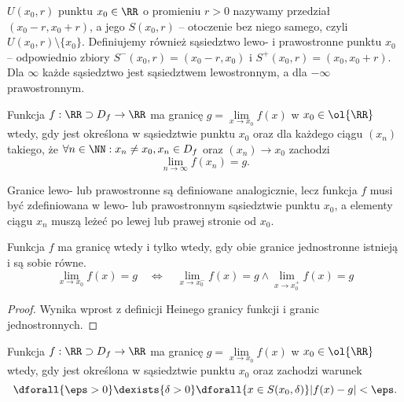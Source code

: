  $U(x_0, r)$ punktu $x_0 \in \RR$ o promieniu $r > 0$ nazywamy przedział $(x_0 - r, x_0 + r)$, a jego  $S(x_0, r)$ -- otoczenie bez niego samego, czyli $U(x_0, r) \setminus \{x_0\}$. Definiujemy również sąsiedztwo lewo- i prawostronne punktu $x_0$ -- odpowiednio zbiory $S^-(x_0, r) = (x_0 - r, x_0)$ i $S^+(x_0, r) = (x_0, x_0 + r)$. Dla $\infty$ każde sąsiedztwo jest sąsiedztwem lewostronnym, a dla $-\infty$ prawostronnym.

\begin{definition}
    Funkcja $f: \RR \supset D_f \to \RR$ ma granicę $g = \lim\limits_{x \to x_0} f(x)$ w $x_0 \in \ol{\RR}$ wtedy, gdy jest określona w sąsiedztwie punktu $x_0$ oraz dla każdego ciągu $(x_n)$ takiego, że $\forall n \in \NN : x_n \neq x_0, x_n \in D_f$ oraz $(x_n) \to x_0$ zachodzi
    \[ \lim_{n\to\infty} f(x_n) = g. \]
\end{definition}

Granice lewo- lub prawostronne są definiowane analogicznie, lecz funkcja $f$ musi być zdefiniowana w lewo- lub prawostronnym sąsiedztwie punktu $x_0$, a elementy ciągu $x_n$ muszą leżeć po lewej lub prawej stronie od $x_0$.

\begin{theorem}
    Funkcja $f$ ma granicę wtedy i tylko wtedy, gdy obie granice jednostronne istnieją i są sobie równe.
    \[ \lim_{x \to x_0} f(x) = g \quad\iff\quad \lim_{x \to x_0^-} f(x) = g \land \lim_{x \to x_0^+} f(x) = g \]
\end{theorem}
\begin{proof}
    Wynika wprost z definicji Heinego granicy funkcji i granic jednostronnych.
\end{proof}

\begin{definition}
    \label{d:cauchy_lim}
    Funkcja $f: \RR \supset D_f \to \RR$ ma granicę $g = \lim\limits_{x \to x_0} f(x)$ w $x_0 \in \ol{\RR}$ wtedy, gdy jest określona w sąsiedztwie punktu $x_0$ oraz zachodzi warunek
    \[ \dforall{\eps > 0} \dexists{\delta > 0} \dforall{x \in S(x_0, \delta)} |f(x) - g| < \eps. \]
\end{definition}

